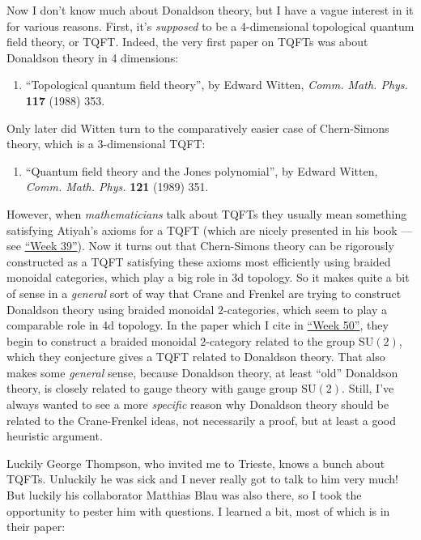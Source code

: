 \documentclass{article}
\def\tightlist{}
\begin{document}
Now I don't know much about Donaldson theory, but I have a vague
interest in it for various reasons. First, it's \emph{supposed} to be a
4-dimensional topological quantum field theory, or TQFT. Indeed, the
very first paper on TQFTs was about Donaldson theory in 4 dimensions:

\begin{enumerate}
\def\labelenumi{\arabic{enumi})}
\tightlist
\item
  ``Topological quantum field theory'', by Edward Witten, \emph{Comm.
  Math. Phys.} \textbf{117} (1988) 353.
\end{enumerate}

Only later did Witten turn to the comparatively easier case of
Chern-Simons theory, which is a \(3\)-dimensional TQFT:

\begin{enumerate}
\def\labelenumi{\arabic{enumi})}
\setcounter{enumi}{1}
\tightlist
\item
  ``Quantum field theory and the Jones polynomial'', by Edward Witten,
  \emph{Comm. Math. Phys.} \textbf{121} (1989) 351.
\end{enumerate}

However, when \emph{mathematicians} talk about TQFTs they usually mean
something satisfying Atiyah's axioms for a TQFT (which are nicely
presented in his book --- see \protect\hyperlink{week39}{``Week 39''}).
Now it turns out that Chern-Simons theory can be rigorously constructed
as a TQFT satisfying these axioms most efficiently using braided
monoidal categories, which play a big role in 3d topology. So it makes
quite a bit of sense in a \emph{general} sort of way that Crane and
Frenkel are trying to construct Donaldson theory using braided monoidal
\(2\)-categories, which seem to play a comparable role in 4d topology.
In the paper which I cite in \protect\hyperlink{week50}{``Week 50''},
they begin to construct a braided monoidal \(2\)-category related to the
group \(\mathrm{SU}(2)\), which they conjecture gives a TQFT related to
Donaldson theory. That also makes some \emph{general} sense, because
Donaldson theory, at least ``old'' Donaldson theory, is closely related
to gauge theory with gauge group \(\mathrm{SU}(2)\). Still, I've always
wanted to see a more \emph{specific} reason why Donaldson theory should
be related to the Crane-Frenkel ideas, not necessarily a proof, but at
least a good heuristic argument.

Luckily George Thompson, who invited me to Trieste, knows a bunch about
TQFTs. Unluckily he was sick and I never really got to talk to him very
much! But luckily his collaborator Matthias Blau was also there, so I
took the opportunity to pester him with questions. I learned a bit, most
of which is in their paper:
\end{document}
